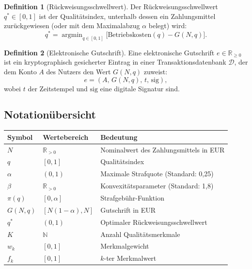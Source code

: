 ﻿\documentclass[a4paper,12pt]{article}
\theoremstyle{definition}
\newtheorem{definition}{Definition}
\begin{document}
\begin{definition}[Rückweisungsschwellwert]
\label{def:schwellwert}
Der Rückweisungsschwellwert $q^* \in [0,1]$ ist der Qualitätsindex, unterhalb
dessen ein Zahlungsmittel zurückgewiesen (oder mit dem Maximalabzug $\alpha$
belegt) wird:
\[
q^* = \operatorname{argmin}_{q \in [0,1]} \bigl[ \text{Betriebskosten}(q) - G(N,q) \bigr].
\]
\end{definition}

\begin{definition}[Elektronische Gutschrift]
\label{def:egutt}
Eine elektronische Gutschrift $e \in \mathbb{R}_{\geq 0}$ ist ein kryptographisch
gesicherter Eintrag in einer Transaktionsdatenbank $\mathcal{D}$, der dem Konto
$A$ des Nutzers den Wert $G(N,q)$ zuweist:
\[
e = (A,\, G(N,q),\, t,\, \text{sig}),
\]
wobei $t$ der Zeitstempel und $\text{sig}$ eine digitale Signatur sind.
\end{definition}

\subsection{Notationübersicht}

\begin{center}
\begin{tabular}{llp{7cm}}
\toprule
Symbol & Wertebereich & Bedeutung \\
\midrule
$N$ & $\mathbb{R}_{>0}$ & Nominalwert des Zahlungsmittels in EUR \\
$q$ & $[0,1]$ & Qualitätsindex \\
$\alpha$ & $(0,1)$ & Maximale Strafquote (Standard: 0,25) \\
$\beta$ & $\mathbb{R}_{>0}$ & Konvexitätsparameter (Standard: 1,8) \\
$\pi(q)$ & $[0,\alpha]$ & Strafgebühr-Funktion \\
$G(N,q)$ & $[N(1-\alpha), N]$ & Gutschrift in EUR \\
$q^*$ & $(0,1)$ & Optimaler Rückweisungsschwellwert \\
$K$ & $\mathbb{N}$ & Anzahl Qualitätsmerkmale \\
$w_k$ & $[0,1]$ & Merkmalgewicht \\
$f_k$ & $[0,1]$ & $k$-ter Merkmalwert \\
\bottomrule
\end{tabular}
\end{center}

\end{document}
